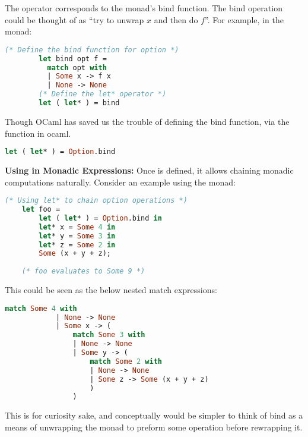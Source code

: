     \begin{Def}

\label{def:let*}

        The  operator corresponds to the monad's bind function. The bind operation could be thought of as ``try to unwrap $x$ and then do $f$''.
        For example, in the  monad:
        
        \begin{lstlisting}[language=OCaml, numbers=none]
        (* Define the bind function for option *)
        let bind opt f =
          match opt with
          | Some x -> f x
          | None -> None
        (* Define the let* operator *)
        let ( let* ) = bind
        \end{lstlisting}
    
    
        \noindent
        Though OCaml has saved us the trouble of defining the bind function, via the  function in ocaml.
        \begin{lstlisting}[language=OCaml, numbers=none]
        let ( let* ) = Option.bind
        \end{lstlisting}
    
        \noindent
        \textbf{Using  in Monadic Expressions:}  
        Once  is defined, it allows chaining monadic computations naturally. Consider an example using the  monad:
    
        \begin{lstlisting}[language=OCaml, numbers=none]
    (* Using let* to chain option operations *)
    let foo =
        let ( let* ) = Option.bind in
        let* x = Some 4 in
        let* y = Some 3 in
        let* z = Some 2 in
        Some (x + y + z);
    
    (* foo evaluates to Some 9 *)
        \end{lstlisting}

        \noindent
        This could be seen as the below nested match expressions:
        \begin{lstlisting}[language=OCaml, numbers=none]
            match Some 4 with
            | None -> None
            | Some x -> (
                match Some 3 with
                | None -> None
                | Some y -> (
                    match Some 2 with
                    | None -> None
                    | Some z -> Some (x + y + z)
                    )
                )
        \end{lstlisting}
        \noindent
        This is for curiosity sake, and conceptually would be simpler to think of bind as a means of unwrapping the monad
        to preform some operation before rewrapping it.
    
    \end{Def}
    
